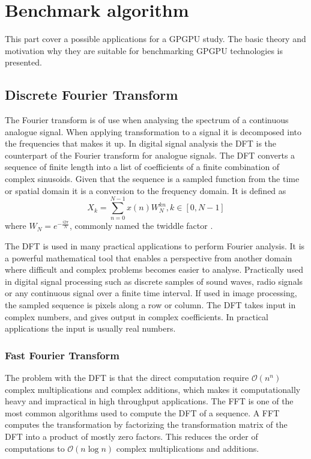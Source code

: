 \chapter{Benchmark algorithm}\label{cha:algorithms}
This part cover a possible applications for a \gls{GPGPU} study. The basic theory and motivation why they are suitable for benchmarking \gls{GPGPU} technologies is presented.

\section{Discrete Fourier Transform}
The Fourier transform is of use when analysing the spectrum of a continuous analogue signal. When applying transformation to a signal it is decomposed into the frequencies that makes it up. In digital signal analysis the \gls{DFT} is the counterpart of the Fourier transform for analogue signals. The \gls{DFT} converts a sequence of finite length into a list of coefficients of a finite combination of complex sinusoids. Given that the sequence is a sampled function from the time or spatial domain it is a conversion to the frequency domain. It is defined as 
\begin{equation}
X_k=\sum_{n=0}^{N-1}x(n)W_N^{kn}, k \in {[0, N-1]}
\end{equation}
where $W_N=e^{-\frac{i2{\pi}}{N}}$, commonly named the twiddle factor \cite{gentleman1966fast}.

The \gls{DFT} is used in many practical applications to perform Fourier analysis. It is a powerful mathematical tool that enables a perspective from another domain where difficult and complex problems becomes easier to analyse. Practically used in digital signal processing such as discrete samples of sound waves, radio signals or any continuous signal over a finite time interval. If used in image processing, the sampled sequence is pixels along a row or column. The \gls{DFT} takes input in complex numbers, and gives output in complex coefficients. In practical applications the input is usually real numbers.

\subsection{Fast Fourier Transform}\label{sec:algorithms:fft}
The problem with the \gls{DFT} is that the direct computation require $\mathcal{O}(n^n)$ complex multiplications and complex additions, which makes it computationally heavy and impractical in high throughput applications. The \gls{FFT} is one of the most common algorithms used to compute the \gls{DFT} of a sequence. A \gls{FFT} computes the transformation by factorizing the transformation matrix of the \gls{DFT} into a product of mostly zero factors. This reduces the order of computations to $\mathcal{O}(n\log{}n)$ complex multiplications and additions.


